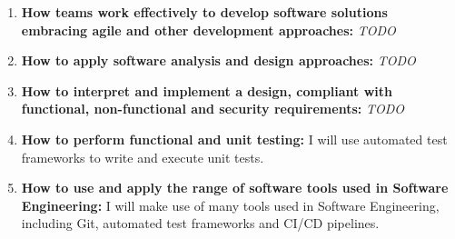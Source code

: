 \documentclass[12pt]{article}
\begin{document}
\begin{enumerate}
		\item \textbf{How teams work effectively to develop software solutions embracing agile and other development approaches:} \textit{TODO}
		\item \textbf{How to apply software analysis and design approaches:} \textit{TODO}
		\item \textbf{How to interpret and implement a design, compliant with functional, non-functional and security requirements:} \textit{TODO}
		\item \textbf{How to perform functional and unit testing:} I will use automated test frameworks to write and execute unit tests.
		\item \textbf{How to use and apply the range of software tools used in Software Engineering:} I will make use of many tools used in Software Engineering, including Git, automated test frameworks and CI/CD pipelines.
	\end{enumerate}
\end{document}
